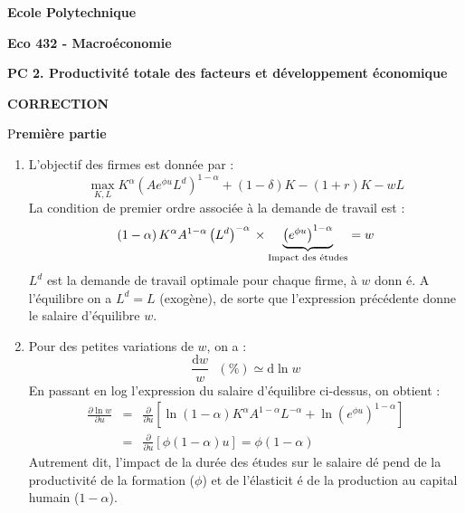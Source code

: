 \documentclass[a4paper,11pt]{article}
\begin{document}
\begin{center}
\textbf{Ecole Polytechnique}

\bigskip

\textbf{Eco 432 - Macro\'{e}conomie}

\bigskip

\textbf{PC 2. Productivité totale des facteurs et d\'{e}veloppement \'{e}conomique}

\bigskip

\textbf{CORRECTION}
\end{center}

\bigskip

P\textbf{remi\`{e}re partie}

\bigskip

\begin{enumerate}
\item L'objectif des firmes est donn\'{e}e par :%
\begin{equation*}
\max_{K,L}K^{\alpha }(Ae^{\phi u}L^{d})^{1-\alpha }+\left( 1-\delta \right)
K-\left( 1+r\right) K-wL
\end{equation*}%
La condition de premier ordre associ\'{e}e \`{a} la demande de travail est :%
\begin{equation*}
\left( 1-\alpha \right) K^{\alpha }A^{1-\alpha }\left( L^{d}\right)
^{-\alpha }\,\times \underset{\text{Impact des \'{e}tudes}}{\underbrace{%
\left( e^{\phi u}\right) ^{1-\alpha }}}=w
\end{equation*}%
$L^{d}$ est la demande de travail optimale pour chaque firme, \`{a} $w$ donn%
\'{e}. A l'\'{e}quilibre on a $L^{d}=L$ (exog\`{e}ne), de sorte que
l'expression pr\'{e}c\'{e}dente donne le salaire d'\'{e}quilibre $w$.

\item Pour des petites variations de $w$, on a :%
\begin{equation*}
\frac{\text{d}w}{w}\text{ }\left( \%\right) \simeq \text{d}\ln w
\end{equation*}%
En passant en log l'expression du salaire d'\'{e}quilibre ci-dessus, on
obtient :%
\begin{eqnarray*}
\frac{\partial \ln w}{\partial u} &=&\frac{\partial }{\partial u}\left[ \ln
\left( 1-\alpha \right) K^{\alpha }A^{1-\alpha }L^{-\alpha }+\ln \left(
e^{\phi u}\right) ^{1-\alpha }\right] \\
&=&\frac{\partial }{\partial u}\left[ \phi \left( 1-\alpha \right) u\right]
=\phi \left( 1-\alpha \right)
\end{eqnarray*}%
Autrement dit, l'impact de la dur\'{e}e des \'{e}tudes sur le salaire d\'{e}%
pend de la productivit\'{e} de la formation ($\phi $) et de l'\'{e}lasticit%
\'{e} de la production au capital humain ($1-\alpha $).


\end{enumerate}
\end{document}

